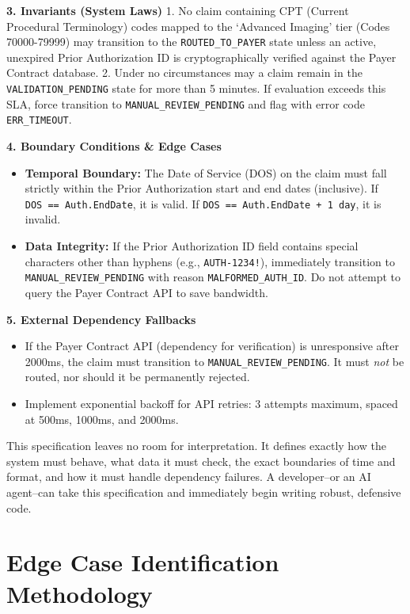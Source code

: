 \documentclass[
  11pt,
  openany,
  oneside]{book}
\providecommand{\tightlist}{%
  \setlength{\itemsep}{0pt}\setlength{\parskip}{0pt}}
\begin{document}
\textbf{3. Invariants (System Laws)} 1. No claim containing CPT (Current
Procedural Terminology) codes mapped to the `Advanced Imaging' tier
(Codes 70000-79999) may transition to the \texttt{ROUTED\_TO\_PAYER}
state unless an active, unexpired Prior Authorization ID is
cryptographically verified against the Payer Contract database. 2. Under
no circumstances may a claim remain in the \texttt{VALIDATION\_PENDING}
state for more than 5 minutes. If evaluation exceeds this SLA, force
transition to \texttt{MANUAL\_REVIEW\_PENDING} and flag with error code
\texttt{ERR\_TIMEOUT}.

\textbf{4. Boundary Conditions \& Edge Cases}

\begin{itemize}
\tightlist
\item
  \textbf{Temporal Boundary:} The Date of Service (DOS) on the claim
  must fall strictly within the Prior Authorization start and end dates
  (inclusive). If \texttt{DOS\ ==\ Auth.EndDate}, it is valid. If
  \texttt{DOS\ ==\ Auth.EndDate\ +\ 1\ day}, it is invalid.
\item
  \textbf{Data Integrity:} If the Prior Authorization ID field contains
  special characters other than hyphens (e.g., \texttt{AUTH-1234!}),
  immediately transition to \texttt{MANUAL\_REVIEW\_PENDING} with reason
  \texttt{MALFORMED\_AUTH\_ID}. Do not attempt to query the Payer
  Contract API to save bandwidth.
\end{itemize}

\textbf{5. External Dependency Fallbacks}

\begin{itemize}
\tightlist
\item
  If the Payer Contract API (dependency for verification) is
  unresponsive after 2000ms, the claim must transition to
  \texttt{MANUAL\_REVIEW\_PENDING}. It must \emph{not} be routed, nor
  should it be permanently rejected.
\item
  Implement exponential backoff for API retries: 3 attempts maximum,
  spaced at 500ms, 1000ms, and 2000ms.
\end{itemize}

This specification leaves no room for interpretation. It defines exactly
how the system must behave, what data it must check, the exact
boundaries of time and format, and how it must handle dependency
failures. A developer--or an AI agent--can take this specification and
immediately begin writing robust, defensive code.

\section{Edge Case Identification
Methodology}\label{edge-case-identification-methodology}
\end{document}
